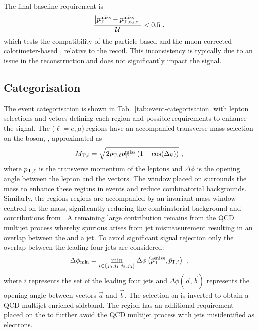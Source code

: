 The final baseline requirement is
%
\begin{equation}
    \frac{\big| p_{\text{T}}^{\mathrm{miss}} - p_{\text{T,calo}}^{\mathrm{miss}} \big|}{\mathcal{U}} < 0.5\ ,
\end{equation}
%
which tests the compatibility of the particle-based \ptmiss and the muon-corrected calorimeter-based \ptmisscalo, relative to the recoil. This inconsistency is typically due to an issue in the reconstruction and does not significantly impact the signal.


\subsection{Categorisation}\label{sec:categorisation}

The event categorisation is shown in Tab.~\ref{tab:event-categorisation} with lepton selections and vetoes defining each region and possible requirements to enhance the signal. The \ellplusjets ($\ell=e,\mu$) regions have an accompanied transverse mass selection on the \PW boson, \mtell, approximated as
%
\begin{equation}
    \mtell = \sqrt{2 \mom_{\mathrm{T},\ell} \ptmiss \left( 1 - \cos(\Delta\phi)\right)}\ ,
\end{equation}
%
where $p_{\mathrm{T},\ell}$ is the transverse momentum of the leptons and $\Delta\phi$ is the opening angle between the lepton and the \vecptmiss vectors. The window placed on \mtell surrounds the \PW mass to enhance these regions in \IWj events and reduce combinatorial backgrounds. Similarly, the \diellplusjets regions regions are accompanied by an invariant mass \mellell window centred on the \PZ mass, significantly reducing the combinatorial background and contributions from \Igstarj. A remaining large contribution remains from the QCD multijet process whereby spurious \ptmiss arises from jet mismeasurement resulting in an overlap between the \ptmiss and a jet. To avoid significant signal rejection only the overlap between the leading four jets are considered:
%
\begin{equation}
    \Delta\phi_{\mathrm{min}} = \min_{i\in\{j_0,j_1,j_2,j_3\}} \Delta\phi\left(\vec{p}_{\text{T}}^{\mathrm{miss}}, \vec{p}_{\mathrm{T},i}\right)\ ,
\end{equation}
%
where $i$ represents the set of the leading four jets and $\Delta\phi(\vec{a},\vec{b})$ represents the opening angle between vectors $\vec{a}$ and $\vec{b}$. The selection on \mindphi is inverted to obtain a QCD multijet enriched sideband. The \eleplusjets region has an additional requirement placed on the \ptmiss to further avoid the QCD multijet process with jets misidentified as electrons.

